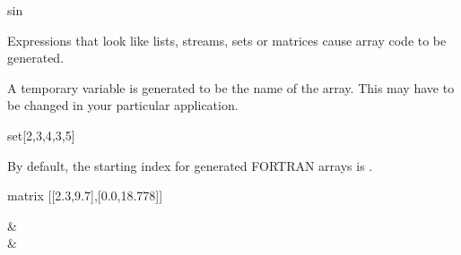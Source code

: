 \begin{xtc}
\begin{xtccomment}
\end{xtccomment}
\begin{spadsrc}
sin %
\end{spadsrc}
\begin{TeXOutput}
\begin{fricasmath}{8}
\sin{\EulerE }%
\end{fricasmath}
\end{TeXOutput}
\end{xtc}
\begin{xtc}
\begin{xtccomment}
Expressions that look like lists, streams, sets or matrices cause
array code to be generated.
\end{xtccomment}
\begin{spadsrc}
[x+1,y+1,z+1] 
\end{spadsrc}
\begin{TeXOutput}
\begin{fricasmath}{9}
%
\end{fricasmath}
\end{TeXOutput}
\end{xtc}
\begin{xtc}
\begin{xtccomment}
A temporary variable is generated to be the name of the array.
This may have to be changed in your particular application.
\end{xtccomment}
\begin{spadsrc}
set[2,3,4,3,5] 
\end{spadsrc}
\begin{TeXOutput}
\begin{fricasmath}{10}
%
\end{fricasmath}
\end{TeXOutput}
\end{xtc}
\begin{xtc}
\begin{xtccomment}
By default, the starting index for generated FORTRAN arrays is .
\end{xtccomment}
\begin{spadsrc}
matrix [[2.3,9.7],[0.0,18.778]] 
\end{spadsrc}
\begin{TeXOutput}
\begin{fricasmath}{11}
\begin{MATRIX}{2}&\\&%
\end{MATRIX}%
\end{fricasmath}
\end{TeXOutput}
\end{xtc}
